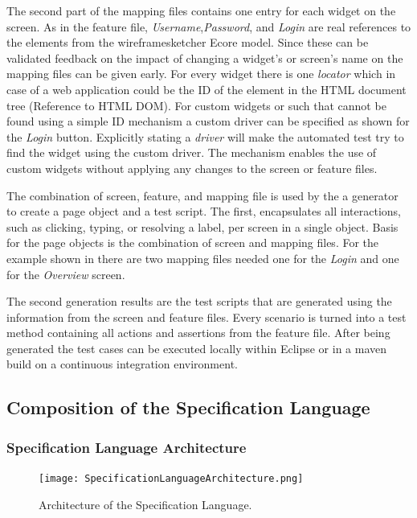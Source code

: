\documentclass{sig-alternate-05-2015}
\begin{document}
The second part of the mapping files contains one entry for each widget on the screen.
As in the feature file, \textit{Username},\textit{Password}, and \textit{Login} are real references to the elements from the wireframesketcher Ecore model.
Since these can be validated feedback on the impact of changing a widget's or screen's name on the mapping files can be given early.
For every widget there is one \textit{locator} which in case of a web application could be the ID of the element in the HTML document tree (Reference to HTML DOM).
For custom widgets or such that cannot be found using a simple ID mechanism a custom driver can be specified as shown for the \textit{Login} button.
Explicitly stating a \textit{driver} will make the automated test try to find the widget using the custom driver. 
The mechanism enables the use of custom widgets without applying any changes to the screen or feature files.

The combination of screen, feature, and mapping file is used by the a generator to create a page object and a test script.
The first, encapsulates all interactions, such as clicking, typing, or resolving a label, per screen in a single object.
Basis for the page objects is the combination of screen and mapping files.
For the example shown in  there are two mapping files needed one for the \textit{Login} and one for the \textit{Overview} screen.

The second generation results are the test scripts that are generated using the information from the screen and feature files.
Every scenario is turned into a test method containing all actions and assertions from the feature file.
After being generated the test cases can be executed locally within Eclipse or in a maven build on a continuous integration environment.

\subsection{Composition of the Specification Language}
\subsubsection{Specification Language Architecture}
\begin{figure}[h]
	\centering
	\texttt{[image: SpecificationLanguageArchitecture.png]}
	\caption{Architecture of the Specification Language.}
	\label{fig:architectureOverview}
\end{figure}
\end{document}
